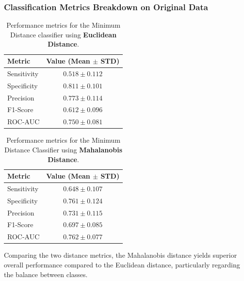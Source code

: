 \documentclass[12pt,a4paper]{article}
\begin{document}
\subsubsection*{Classification Metrics Breakdown on Original Data}

\begin{table}[H]
    \centering
    \begin{tabular}{lc}
        \toprule
        \textbf{Metric} & \textbf{Value (Mean $\pm$ STD)} \\
        \midrule
        Sensitivity & $0.518 \pm 0.112$ \\
        Specificity & $0.811 \pm 0.101$ \\
        Precision   & $0.773 \pm 0.114$ \\
        F1-Score    & $0.612 \pm 0.096$ \\
        ROC-AUC     & $0.750 \pm 0.081$ \\
        \bottomrule
    \end{tabular}
    \caption{Performance metrics for the Minimum Distance classifier using \textbf{Euclidean Distance}.}
    \label{tab:euclidean_metrics}
\end{table}
\begin{table}[H]
    \centering
    \begin{tabular}{lc}
        \toprule
        \textbf{Metric} & \textbf{Value (Mean $\pm$ STD)} \\
        \midrule
        Sensitivity & $0.648 \pm 0.107$ \\
        Specificity & $0.761 \pm 0.124$ \\
        Precision   & $0.731 \pm 0.115$ \\
        F1-Score    & $0.697 \pm 0.085$ \\
        ROC-AUC     & $0.762 \pm 0.077$ \\
        \bottomrule
    \end{tabular}
    \caption{Performance metrics for the Minimum Distance Classifier using \textbf{Mahalanobis Distance}.}
    \label{tab:mahalanobis_metrics}
\end{table}

Comparing the two distance metrics, the Mahalanobis distance yields superior overall performance compared to the Euclidean distance, particularly regarding the balance between classes.
\end{document}
